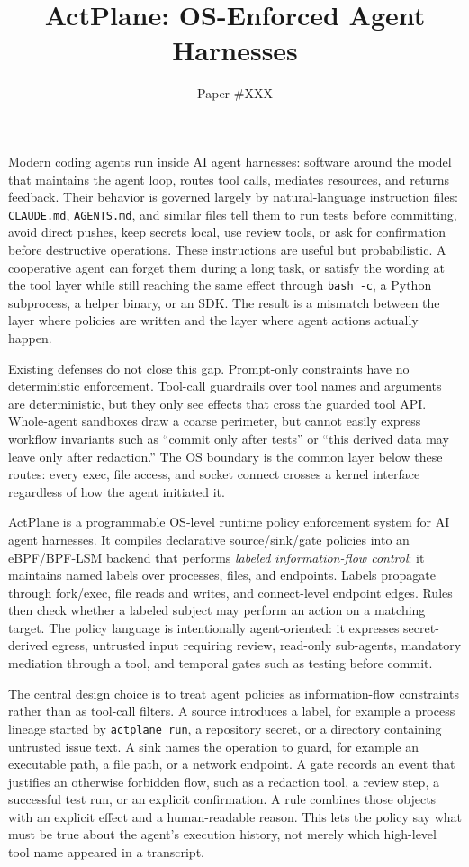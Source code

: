 \documentclass[sigplan,10pt]{acmart}
\title[ActPlane]{ActPlane: OS-Enforced Agent Harnesses}
\author{Paper \#XXX}
\affiliation{%
  \institution{Anonymous Submission}
  \city{}
  \country{}}
\begin{document}
\maketitle

Modern coding agents run inside AI agent harnesses: software around the model that
maintains the agent loop, routes tool calls, mediates resources, and returns
feedback. Their behavior is governed largely by natural-language instruction
files: \texttt{CLAUDE.md}, \texttt{AGENTS.md}, and similar files tell them to run
tests before committing, avoid direct pushes, keep secrets local, use review
tools, or ask for confirmation before destructive operations. These instructions
are useful but probabilistic. A cooperative agent can forget them during a long
task, or satisfy the wording at the tool layer while still reaching the same
effect through \texttt{bash -c}, a Python subprocess, a helper binary, or an
SDK. The result is a mismatch between the layer where policies are written and
the layer where agent actions actually happen.

Existing defenses do not close this gap. Prompt-only constraints have no
deterministic enforcement. Tool-call guardrails over tool
names and arguments are deterministic, but they only see effects that cross the
guarded tool API. Whole-agent sandboxes draw a coarse perimeter, but cannot
easily express workflow invariants such as ``commit only after tests'' or
``this derived data may leave only after redaction.'' The OS boundary is the
common layer below these routes: every exec, file access, and socket connect
crosses a kernel interface regardless of how the agent initiated it.

ActPlane is a programmable OS-level runtime policy enforcement system for AI
agent harnesses. It compiles declarative source/sink/gate policies into an
eBPF/BPF-LSM backend that performs
\emph{labeled information-flow control}: it maintains named labels over
processes, files, and endpoints. Labels propagate through
fork/exec, file reads and writes, and connect-level endpoint edges. Rules then check whether a
labeled subject may perform an action on a matching target. The policy language
is intentionally agent-oriented: it expresses secret-derived egress, untrusted
input requiring review, read-only sub-agents, mandatory mediation through a
tool, and temporal gates such as testing before commit.

The central design choice is to treat agent policies as information-flow
constraints rather than as tool-call filters. A source introduces a label, for
example a process lineage started by \texttt{actplane run}, a repository secret,
or a directory containing untrusted issue text. A sink names the operation to
guard, for example an executable path, a file path, or a network endpoint. A
gate records an event that justifies an otherwise forbidden flow, such as a
redaction tool, a review step, a successful test run, or an explicit
confirmation. A rule combines those objects with an explicit effect and a
human-readable reason. This lets the policy say what must be true about the
agent's execution history, not merely which high-level tool name appeared in a
transcript.
\end{document}
